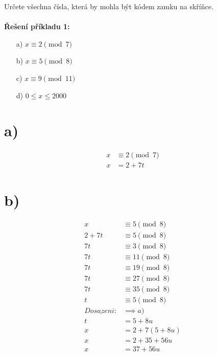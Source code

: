 \documentclass[a4paper, 10pt, oneside]{article}       %
\begin{document}
Určete všechna čísla, která by mohla být kódem zamku na skříňce.
\newline\\\\
\textbf{Řešení příkladu 1:}
\newline
\begin{enumerate}
    \item[a)] $x \equiv 2\pmod{7}$ 
    \item[b)] $x \equiv 5\pmod{8}$ 
    \item[c)] $x \equiv 9\pmod{11}$
    \item[d)] $0 \leq x \leq 2000$
\end{enumerate}
\newline

\begin{multicols}{3}
\raggedcolumns

\section*{a)}
\begin{align*}
    x &\equiv 2 \pmod{7} \\
    x &= 2 + 7t
\end{align*}
\newline

\section*{b)}
\begin{align*}
    x &\equiv 5\pmod{8}         \\
    2 + 7t &\equiv 5\pmod{8}    \\
    7t &\equiv 3\pmod{8}        \\
    7t &\equiv 11\pmod{8}       \\
    7t &\equiv 19\pmod{8}       \\
    7t &\equiv 27\pmod{8}       \\
    7t &\equiv 35\pmod{8}       \\
    t &\equiv 5\pmod{8}         \\
    \underline{Dosazeni:} &\implies a)      \\
    t &= 5 + 8u                 \\
    x &= 2 + 7 ( 5 + 8u )       \\
    x &= 2 + 35 + 56u           \\
    x &= 37 + 56u               \\
\end{align*}
\newline


\end{multicols}
\end{document}
